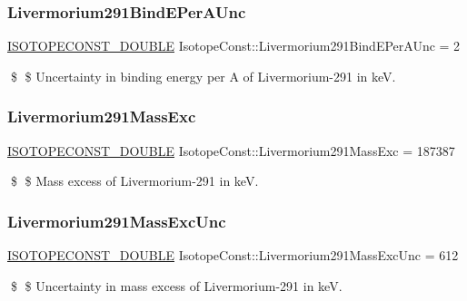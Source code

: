 \subsubsection{\texorpdfstring{Livermorium291\+Bind\+E\+Per\+A\+Unc}{Livermorium291BindEPerAUnc}}
{\footnotesize\ttfamily \mbox{\hyperlink{group___isotope_const-_macros_ga8f45a7272ce02c0b4c65c44636ed719a}{I\+S\+O\+T\+O\+P\+E\+C\+O\+N\+S\+T\+\_\+\+D\+O\+U\+B\+LE}} Isotope\+Const\+::\+Livermorium291\+Bind\+E\+Per\+A\+Unc = 2}

\$ \$ Uncertainty in binding energy per A of Livermorium-\/291 in keV. \mbox{\label{group___isotope_const-_livermorium-_lv291_gac807ba1bb78e49f6939b8033a5cee41e}} 
\subsubsection{\texorpdfstring{Livermorium291\+Mass\+Exc}{Livermorium291MassExc}}
{\footnotesize\ttfamily \mbox{\hyperlink{group___isotope_const-_macros_ga8f45a7272ce02c0b4c65c44636ed719a}{I\+S\+O\+T\+O\+P\+E\+C\+O\+N\+S\+T\+\_\+\+D\+O\+U\+B\+LE}} Isotope\+Const\+::\+Livermorium291\+Mass\+Exc = 187387}

\$ \$ Mass excess of Livermorium-\/291 in keV. \mbox{\label{group___isotope_const-_livermorium-_lv291_ga29c32d21f9d1a0647ad6a386fc24dbec}} 
\subsubsection{\texorpdfstring{Livermorium291\+Mass\+Exc\+Unc}{Livermorium291MassExcUnc}}
{\footnotesize\ttfamily \mbox{\hyperlink{group___isotope_const-_macros_ga8f45a7272ce02c0b4c65c44636ed719a}{I\+S\+O\+T\+O\+P\+E\+C\+O\+N\+S\+T\+\_\+\+D\+O\+U\+B\+LE}} Isotope\+Const\+::\+Livermorium291\+Mass\+Exc\+Unc = 612}

\$ \$ Uncertainty in mass excess of Livermorium-\/291 in keV. \mbox{\label{group___isotope_const-_livermorium-_lv291_ga28ee9ef842fecf428784aff34ebfa2e9}} 
